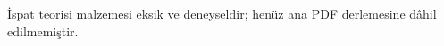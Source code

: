 
\begin{editorial}
  İspat teorisi malzemesi eksik ve deneyseldir; henüz ana PDF derlemesine
  dâhil edilmemiştir.
\end{editorial}
\OLEndPartHook
